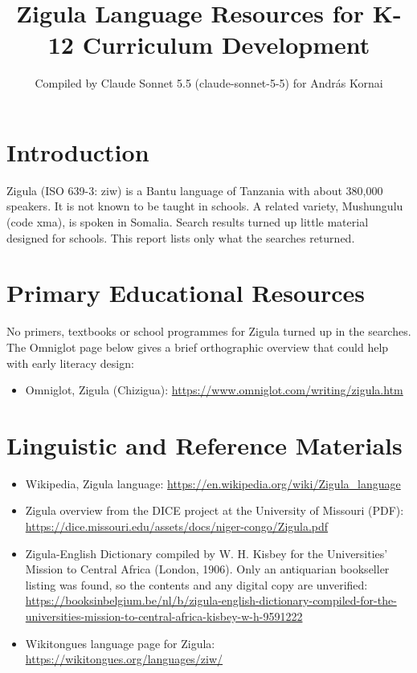 \documentclass[12pt]{article}
\title{Zigula Language Resources for K-12 Curriculum Development}
\author{Compiled by Claude Sonnet 5.5 (claude-sonnet-5-5) for Andr\'as Kornai}
\date{}
\begin{document}
\maketitle

\section{Introduction}
Zigula (ISO 639-3: ziw) is a Bantu language of Tanzania with about 380,000 speakers. It is not known to be taught in schools. A related variety, Mushungulu (code xma), is spoken in Somalia. Search results turned up little material designed for schools. This report lists only what the searches returned.

\section{Primary Educational Resources}
No primers, textbooks or school programmes for Zigula turned up in the searches. The Omniglot page below gives a brief orthographic overview that could help with early literacy design:
\begin{itemize}
\item Omniglot, Zigula (Chizigua): \url{https://www.omniglot.com/writing/zigula.htm}
\end{itemize}

\section{Linguistic and Reference Materials}
\begin{itemize}
\item Wikipedia, Zigula language: \url{https://en.wikipedia.org/wiki/Zigula_language}
\item Zigula overview from the DICE project at the University of Missouri (PDF): \url{https://dice.missouri.edu/assets/docs/niger-congo/Zigula.pdf}
\item Zigula-English Dictionary compiled by W. H. Kisbey for the Universities' Mission to Central Africa (London, 1906). Only an antiquarian bookseller listing was found, so the contents and any digital copy are unverified: \url{https://booksinbelgium.be/nl/b/zigula-english-dictionary-compiled-for-the-universities-mission-to-central-africa-kisbey-w-h-9591222}
\item Wikitongues language page for Zigula: \url{https://wikitongues.org/languages/ziw/}
\end{itemize}
\end{document}
